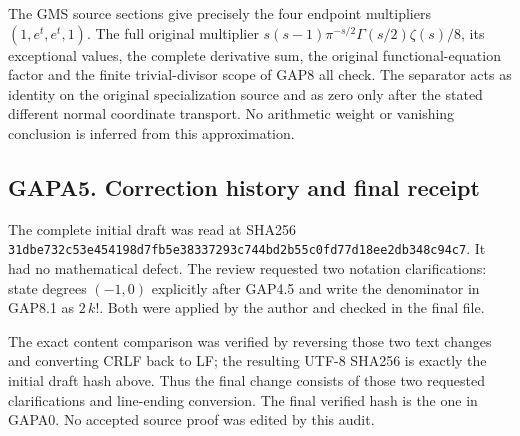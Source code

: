 The GMS source sections give precisely the four endpoint multipliers
\((1,e^t,e^t,1)\). The full original multiplier
\(s(s-1)\pi^{-s/2}\Gamma(s/2)\zeta(s)/8\), its exceptional values, the
complete derivative sum, the original functional-equation factor and the
finite trivial-divisor scope of GAP8 all check. The separator acts as
identity on the original specialization source and as zero only after
the stated different normal coordinate transport. No arithmetic weight
or vanishing conclusion is inferred from this approximation.

\subsection{GAPA5. Correction history and final
receipt}\label{gapa5.-correction-history-and-final-receipt}

The complete initial draft was read at SHA256
\nolinkurl{31dbe732c53e454198d7fb5e38337293c744bd2b55c0fd77d18ee2db348c94c7}.
It had no mathematical defect. The review requested two notation
clarifications: state degrees \((-1,0)\) explicitly after GAP4.5 and
write the denominator in GAP8.1 as \(2\,k!\). Both were applied by the
author and checked in the final file.

The exact content comparison was verified by reversing those two text
changes and converting CRLF back to LF; the resulting UTF-8 SHA256 is
exactly the initial draft hash above. Thus the final change consists of
those two requested clarifications and line-ending conversion. The final
verified hash is the one in GAPA0. No accepted source proof was edited
by this audit.
